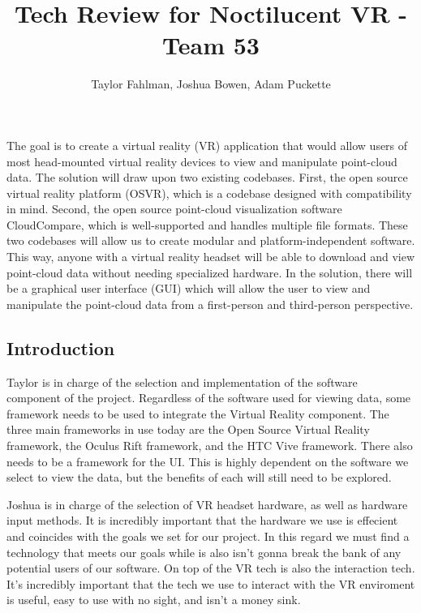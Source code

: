 \title {Tech Review for Noctilucent VR - Team 53}
\author {Taylor Fahlman, Joshua Bowen, Adam Puckette}

\maketitle

\abstract

The goal is to create a virtual reality (VR) application that would allow users of most head-mounted virtual reality devices to view and manipulate point-cloud data. 
The solution will draw upon two existing codebases. 
First, the open source virtual reality platform (OSVR), which is a codebase designed with compatibility in mind. 
Second, the open source point-cloud visualization software CloudCompare, which is well-supported and handles multiple file formats. 
These two codebases will allow us to create modular and platform-independent software. 
This way, anyone with a virtual reality headset will be able to download and view point-cloud data without needing specialized hardware.
In the solution, there will be a graphical user interface (GUI) which will allow the user to view and manipulate the point-cloud data from a first-person and third-person perspective. 

\newpage
\thispagestyle{empty}
\mbox{}


\subsection{Introduction}

Taylor is in charge of the selection and implementation of the software component of the project.
Regardless of the software used for viewing data, some framework needs to be used to integrate the Virtual Reality component.
The three main frameworks in use today are the Open Source Virtual Reality framework, the Oculus Rift framework, and the 
HTC Vive framework.
There also needs to be a framework for the UI. This is highly dependent on the software we select to view the data,
but the benefits of each will still need to be explored.

Joshua is in charge of the selection of VR headset hardware, as well as hardware input methods.
It is incredibly important that the hardware we use is effecient and coincides with the goals we set for our project.
In this regard we must find a technology that meets our goals while is also isn't gonna break the bank of any potential users of our software.
On top of the VR tech is also the interaction tech.
It's incredibly important that the tech we use to interact with the VR enviroment is useful, easy to use with no sight, and isn't a money sink.

